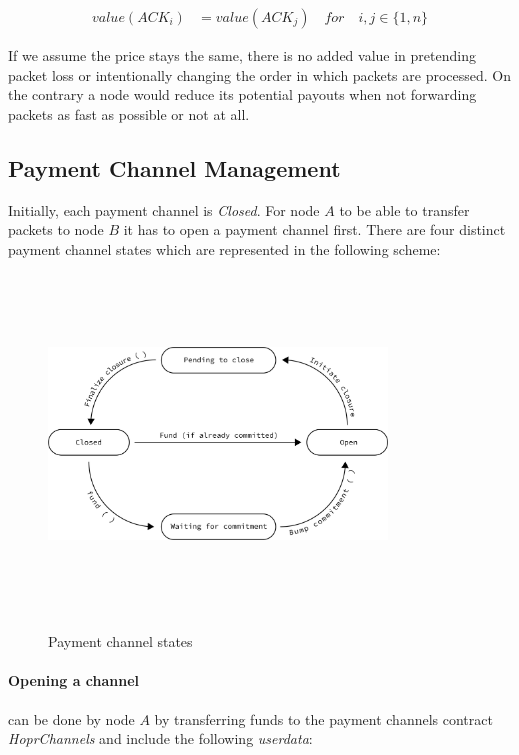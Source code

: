 \begin{align}
value ( ACK_i )  &  =value ( ACK_j ) \quad for \quad i,j\in \{1,n\}
\end{align}

If we assume the price stays the same, there is no added value in pretending
packet loss or intentionally changing the order in which packets are processed.
On the contrary a node would reduce its potential payouts when not forwarding
packets as fast as possible or not at all.

\subsection{Payment Channel Management}
\label{sec:paymentchannelmanagement}

Initially, each payment channel is \textit{Closed}. For node $A$ to be able to
transfer packets to node $B$ it has to open a payment channel first. There are
four distinct payment channel states which are represented in the following
scheme:

\begin{figure}[H]
    \centering
    \includegraphics[width=9cm,height=9cm,keepaspectratio]{../yellowpaper/images/states2.png}
    \label{fig:payment channel states}
    \caption{Payment channel states}
\end{figure}

\paragraph{Opening a channel} can be done by node $A$ by transferring funds to
the payment channels contract \textit{HoprChannels} and include the following
\textit{userdata}:

